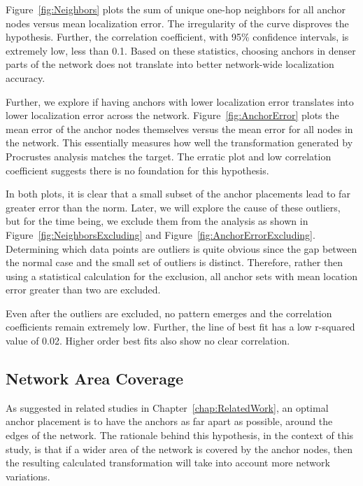 Figure~\ref{fig:Neighbors} plots the sum of unique one-hop neighbors for all anchor nodes versus mean localization error.  The irregularity of the curve disproves the hypothesis. Further, the correlation coefficient, with 95\% confidence intervals, is extremely low, less than 0.1.  Based on these statistics, choosing anchors in denser parts of the network does not translate into better network-wide localization accuracy.

Further, we explore if having anchors with lower localization error translates into lower localization error across the network. Figure~\ref{fig:AnchorError} plots the mean error of the anchor nodes themselves versus the mean error for all nodes in the network. This essentially measures how well the transformation generated by Procrustes analysis matches the target.  The erratic plot and low correlation coefficient suggests there is no foundation for this hypothesis.  

In both plots, it is clear that a small subset of the anchor placements lead to far greater error than the norm.  Later, we will explore the cause of these outliers, but for the time being, we exclude them from the analysis as shown in Figure~\ref{fig:NeighborsExcluding} and Figure~\ref{fig:AnchorErrorExcluding}. Determining which data points are outliers is quite obvious since the gap between the normal case and the small set of outliers is distinct. Therefore, rather then using a statistical calculation for the exclusion, all anchor sets with mean location error greater than two are excluded.

Even after the outliers are excluded, no pattern emerges and the correlation coefficients remain extremely low.  Further, the line of best fit has a low r-squared value of 0.02.  Higher order best fits also show no clear correlation.

\subsection{Network Area Coverage}
\label{sec:anchorcoverage}
As suggested in related studies in Chapter~\ref{chap:RelatedWork}, an optimal anchor placement is to have the anchors as far apart as possible, around the edges of the network.  The rationale behind this hypothesis, in the context of this study, is that if a wider area of the network is covered by the anchor nodes, then the resulting calculated transformation will take into account more network variations.

